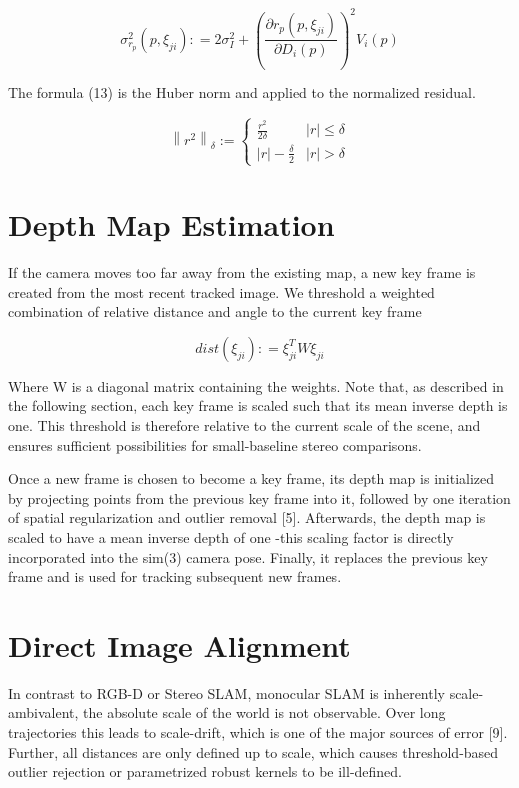 \begin{equation}
\sigma _{r_{p}} ^{2}(p,\xi _{ji}): = 2\sigma _{I} ^{2} + {\left( \frac {\partial r_{p}(p,\xi_{ji})} {\partial D_{i} (p)} \right)^{2}} V_{i}(p)
\end{equation}

The formula (13) is the Huber norm and applied to the normalized residual.

\begin{equation}
{\left\| r^{2} \right\|_{\delta}}:=\left\{\begin{array}{ll}
\frac {r^{2}} {2\delta}            & |r|\leq \delta       \\
|r|-\frac {\delta} {2}      & |r| > \delta
\end{array} \right.
\end{equation}


\section{Depth Map Estimation}
If the camera moves too far away from the existing map, a new key frame is created from the most recent tracked image. We threshold a weighted combination of relative distance and angle to the current key frame

\begin{equation}
dist({\xi _{ji}}): = \xi _{ji}^TW{\xi _{ji}}
\end{equation}

Where W is a diagonal matrix containing the weights. Note that, as described in the following section, each key frame is scaled such that its mean inverse depth is one. This threshold is therefore relative to the current scale of the scene, and ensures sufficient possibilities for small-baseline stereo comparisons.

Once a new frame is chosen to become a key frame, its depth map is initialized by projecting points from the previous key frame into it, followed by one iteration of spatial regularization and outlier removal [5]. Afterwards, the depth map is scaled to have a mean inverse depth of one -this scaling factor is directly incorporated into the sim(3) camera pose. Finally, it replaces the previous key frame and is used for tracking subsequent new frames.


\section{Direct Image Alignment}
In contrast to RGB-D or Stereo SLAM, monocular SLAM is inherently scale-ambivalent, the absolute scale of the world is not observable. Over long trajectories this leads to scale-drift, which is one of the major sources of error [9]. Further, all distances are only defined up to scale, which causes threshold-based outlier rejection or parametrized robust kernels to be ill-defined.

